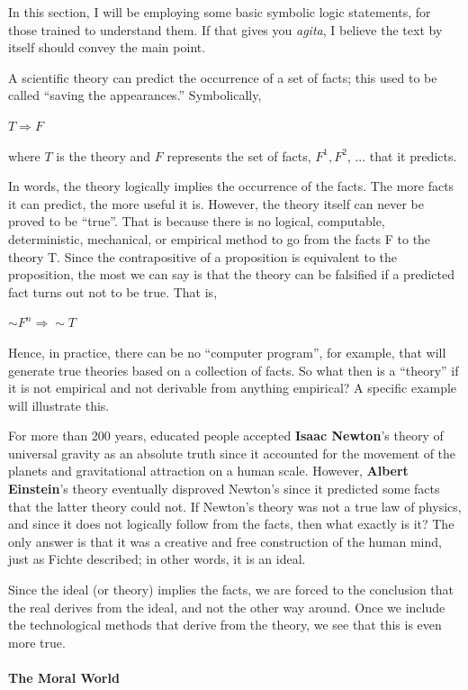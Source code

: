 In this section, I will be employing some basic symbolic logic statements, for those trained to understand them. If that gives you \emph{agita}, I believe the text by itself should convey the main point.

A scientific theory can predict the occurrence of a set of facts; this used to be called ``saving the appearances.'' Symbolically,

$T \Rightarrow F$

where $T$ is the theory and $F$ represents the set of facts, $F^1, F^2$, ... that it predicts.

In words, the theory logically implies the occurrence of the facts. The more facts it can predict, the more useful it is. However, the theory itself can never be proved to be ``true''. That is because there is no logical, computable, deterministic, mechanical, or empirical method to go from the facts F to the theory T. Since the contrapositive of a proposition is equivalent to the proposition, the most we can say is that the theory can be falsified if a predicted fact turns out not to be true. That is,

$\sim F^n \Rightarrow \sim T$


Hence, in practice, there can be no ``computer program'', for example, that will generate true theories based on a collection of facts. So what then is a ``theory'' if it is not empirical and not derivable from anything empirical? A specific example will illustrate this.

For more than 200 years, educated people accepted \textbf{Isaac Newton}'s theory of universal gravity as an absolute truth since it accounted for the movement of the planets and gravitational attraction on a human scale. However, \textbf{Albert Einstein}'s theory eventually disproved Newton's since it predicted some facts that the latter theory could not. If Newton's theory was not a true law of physics, and since it does not logically follow from the facts, then what exactly is it? The only answer is that it was a creative and free construction of the human mind, just as Fichte described; in other words, it is an ideal.

Since the ideal (or theory) implies the facts, we are forced to the conclusion that the real derives from the ideal, and not the other way around. Once we include the technological methods that derive from the theory, we see that this is even more true.

\paragraph{The Moral World}


